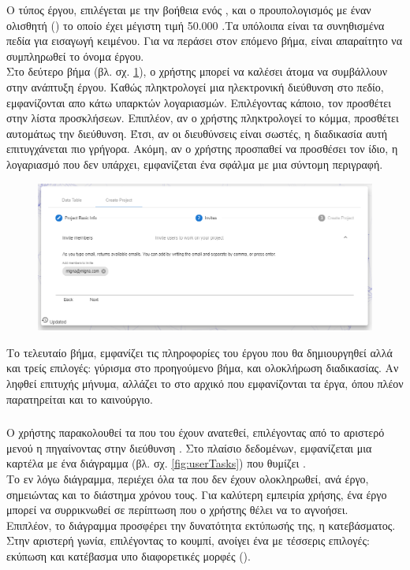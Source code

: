 \pSpace Ο τύπος έργου, επιλέγεται με την βοήθεια ενός , και ο προυπολογισμός με έναν ολισθητή () το οποίο έχει μέγιστη τιμή 50.000 .Τα υπόλοιπα είναι τα συνηθισμένα πεδία για εισαγωγή κειμένου. Για να περάσει στον επόμενο βήμα, είναι απαραίτητο να συμπληρωθεί το όνομα έργου.\\

\pSpace Στο δεύτερο βήμα (βλ. σχ. \ref{fig:userCreateProject2}), ο χρήστης μπορεί να καλέσει άτομα να συμβάλλουν στην ανάπτυξη έργου. Καθώς πληκτρολογεί μια ηλεκτρονική διεύθυνση στο πεδίο, εμφανίζονται απο κάτω  υπαρκτών λογαριασμών. Επιλέγοντας κάποιο, τον προσθέτει στην λίστα προσκλήσεων. Επιπλέον, αν ο χρήστης πληκτρολογεί το κόμμα, προσθέτει αυτομάτως την διεύθυνση. Έτσι, αν οι διευθύνσεις είναι σωστές, η διαδικασία αυτή επιτυγχάνεται πιο γρήγορα. Ακόμη, αν ο χρήστης προσπαθεί να προσθέσει τον ίδιο, η λογαριασμό που δεν υπάρχει, εμφανίζεται ένα σφάλμα με μια σύντομη περιγραφή.

\begin{figure}[!htb]
\includegraphics[width=\columnwidth, scale=4]{images/userCreateProject2.png}
\caption{}
\label{fig:userCreateProject2}
\end{figure}

\pSpace Το τελευταίο βήμα, εμφανίζει τις πληροφορίες του έργου που θα δημιουργηθεί αλλά και τρείς επιλογές: γύρισμα στο προηγούμενο βήμα,  και ολοκλήρωση διαδικασίας. Αν ληφθεί επιτυχής μήνυμα, αλλάζει το  στο αρχικό που εμφανίζονται τα έργα, όπου πλέον παρατηρείται και το καινούργιο.

\subsubsection*{}
\pSpace Ο χρήστης παρακολουθεί τα  που του έχουν ανατεθεί, επιλέγοντας  από το αριστερό μενού η πηγαίνοντας στην διεύθυνση . Στο πλαίσιο δεδομένων, εμφανίζεται μια καρτέλα με ένα διάγραμμα (βλ. σχ. \ref{fig:userTasks}) που θυμίζει .\\
\pSpace Το εν λόγω διάγραμμα, περιέχει όλα τα  που δεν έχουν ολοκληρωθεί, ανά έργο, σημειώντας και το διάστημα χρόνου τους. Για καλύτερη εμπειρία χρήσης, ένα έργο μπορεί να συρρικνωθεί σε περίπτωση που ο χρήστης θέλει να το αγνοήσει.\\
\pSpace Επιπλέον, το διάγραμμα προσφέρει την δυνατότητα εκτύπωσής της, η κατεβάσματος. Στην αριστερή γωνία, επιλέγοντας το κουμπί, ανοίγει ένα  με τέσσερις επιλογές: εκύπωση και κατέβασμα υπο διαφορετικές μορφές ().


